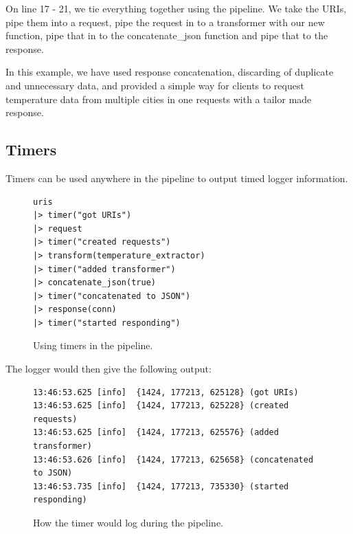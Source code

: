 \documentclass{cslthse-msc}
\begin{document}
On line 17 - 21, we tie everything together using the pipeline. We take the URIs, pipe them into a request, pipe the request in to a transformer with our new function, pipe that in to the concatenate\_json function and pipe that to the response.

In this example, we have used response concatenation, discarding of duplicate and unnecessary data, and provided a simple way for clients to request temperature data from multiple cities in one requests with a tailor made response.

\subsection{Timers}
Timers can be used anywhere in the pipeline to output timed logger information.

\begin{figure}[H]
  \centering
\begin{lstlisting}[breaklines=true,frame=single]
uris
|> timer("got URIs")
|> request
|> timer("created requests")
|> transform(temperature_extractor)
|> timer("added transformer")
|> concatenate_json(true)
|> timer("concatenated to JSON")
|> response(conn)
|> timer("started responding")
\end{lstlisting}
  \caption{Using timers in the pipeline.}
\end{figure}

The logger would then give the following output:

\begin{figure}[H]
  \centering
\begin{lstlisting}[breaklines=true,frame=single]
13:46:53.625 [info]  {1424, 177213, 625128} (got URIs)
13:46:53.625 [info]  {1424, 177213, 625228} (created requests)
13:46:53.625 [info]  {1424, 177213, 625576} (added transformer)
13:46:53.626 [info]  {1424, 177213, 625658} (concatenated to JSON)
13:46:53.735 [info]  {1424, 177213, 735330} (started responding)
\end{lstlisting}
  \caption{How the timer would log during the pipeline.}
\end{figure}

\cleardoublepage
{}
{}



\end{document}
